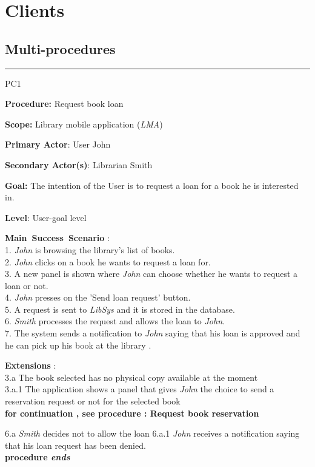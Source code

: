 \section{Clients}
\label{chap:usage_guide}

\subsection{Multi-procedures}

\vspace{0.5cm}
\hrule
\begin{lyxlist}{PC1}
\small{
\item [\textbf{Procedure:}] Request book loan
\item [\textbf{Scope:}] Library mobile application (\emph{LMA})
\item [\textbf{Primary Actor}:] User John
\item [\textbf{Secondary Actor(s)}:] Librarian Smith
\item [\textbf{Goal:}] The intention of the User is to request a loan for a book
he is interested in.
\item [\textbf{Level}:] User-goal level
\item [\textbf{Main~Success~Scenario}]:\\
1. \emph{John} is browsing the library's list of books. \\
2. \emph{John} clicks on a book he wants to request a loan for. \\
3. A new panel is shown where \emph{John} can choose whether he wants to
request a loan or not. \\
4. \emph{John} presses on the 'Send loan request' button. \\
5. A request is sent to \emph{LibSys} and it is stored in the database. \\
6. \emph{Smith}  processes the request and allows the loan to \emph{John}.\\ 
7. The system sends a notification to \emph{John} saying that his loan is
approved and he can pick up his book at the library .\\


\item [\textbf{Extensions}]:\\
3.a The book selected has no physical copy available at the moment\\
\hspace*{0.5cm} 3.a.1 The application shows a panel that gives \emph{John} the
choice to send a reservation request or not for the selected book \\
\hspace*{0.5cm} \textbf{for continuation , see procedure : Request book
reservation}

6.a \emph{Smith} decides not to allow the loan
\hspace*{0.5cm} 6.a.1 \emph{John} receives a notification saying that his loan
request has been denied.\\
\hspace*{0.5cm} \textbf{procedure \emph{ends}}

}

\end{lyxlist}
